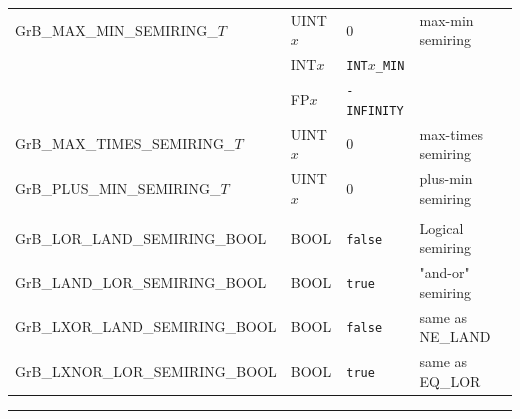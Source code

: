 \begin{table}
\begin{threeparttable}
\begin{tabular}{l|l|l|l}
{\sf GrB\_MAX\_MIN\_SEMIRING\_$T$}      & {\sf UINT$x$}            & 0                    & max-min semiring   \\
                                      & {\sf INT$x$}             & {\tt INT$x$\_MIN}    &                 \\
                                      & {\sf FP$x$}              & {\tt -INFINITY}      &                 \\
{\sf GrB\_MAX\_TIMES\_SEMIRING\_$T$}    & {\sf UINT$x$}            & 0                    & max-times semiring \\
{\sf GrB\_PLUS\_MIN\_SEMIRING\_$T$}     & {\sf UINT$x$}            & 0                    & plus-min semiring  \\
                                      &                          &                      &                 \\
{\sf GrB\_LOR\_LAND\_SEMIRING\_BOOL}  & {\sf BOOL}               & {\tt false}          & Logical semiring   \\
{\sf GrB\_LAND\_LOR\_SEMIRING\_BOOL}  & {\sf BOOL}               & {\tt true}           & "and-or" semiring  \\
{\sf GrB\_LXOR\_LAND\_SEMIRING\_BOOL} & {\sf BOOL}               & {\tt false}          & same as {\sf NE\_LAND} \\
{\sf GrB\_LXNOR\_LOR\_SEMIRING\_BOOL} & {\sf BOOL}               & {\tt true}           & same as {\sf EQ\_LOR} \\
\end{tabular}

\hrule
{}
\end{threeparttable}
\end{table}

